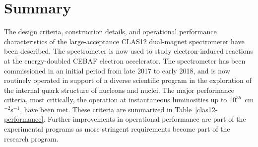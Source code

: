 \documentclass[final,3p,twocolumn]{elsarticle}
\begin{document}
\section{Summary} 

The design criteria, construction details, and operational performance characteristics of the large-acceptance
CLAS12 dual-magnet spectrometer have been described. The spectrometer is now used to study electron-induced
reactions at the energy-doubled CEBAF electron accelerator. The spectrometer has been commissioned in an initial
period from late 2017 to early 2018, and is now routinely operated in support of a diverse scientific program in the
exploration of the internal quark structure of nucleons and nuclei. The major performance criteria, most critically,
the operation at  instantaneous luminosities up to $10^{35}$~cm$^{-2}$s$^{-1}$, have been met. These criteria are
summarized in Table~\ref{clas12-performance}. Further improvements in operational performance are part of the
experimental programs as more stringent requirements become part of the research program.  
\end{document}
